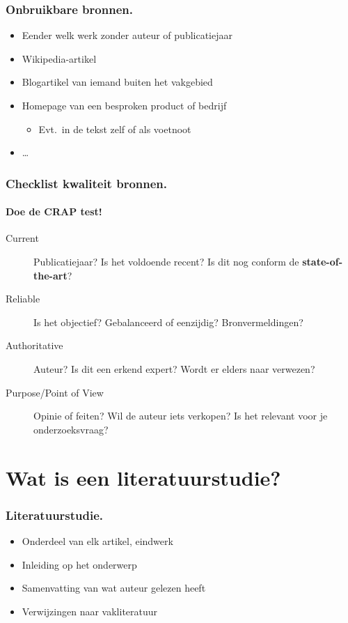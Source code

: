 \documentclass[aspectratio=169]{beamer}
\begin{document}
\begin{frame}
  \frametitle{Onbruikbare bronnen.}

  \begin{itemize}
    \item Eender welk werk zonder auteur of publicatiejaar
    \item Wikipedia-artikel
    \item Blogartikel van iemand buiten het vakgebied
    \item Homepage van een besproken product of bedrijf
    \begin{itemize}
      \item Evt.~in de tekst zelf of als voetnoot
    \end{itemize}
    \item \dots
  \end{itemize}
\end{frame}

\begin{frame}
  \frametitle{Checklist kwaliteit bronnen.}
  \framesubtitle{Doe de CRAP test!}

  \begin{description}
    \item[Current] Publicatiejaar? Is het voldoende recent? Is dit nog conform de \textbf{state-of-the-art}?
    \item[Reliable] Is het objectief? Gebalanceerd of eenzijdig?
    Bronvermeldingen?
    \item[Authoritative] Auteur? Is dit een erkend expert? Wordt er elders naar verwezen?
    \item[Purpose/Point of View] Opinie of feiten? Wil de auteur iets verkopen? Is het relevant voor je onderzoeksvraag?
  \end{description}

\end{frame}



\section{Wat is een literatuurstudie?}

\begin{frame}
  \frametitle{Literatuurstudie.}

  \begin{itemize}
    \item Onderdeel van elk artikel, eindwerk
    \item Inleiding op het onderwerp
    \item Samenvatting van wat auteur gelezen heeft
    \item Verwijzingen naar vakliteratuur
  \end{itemize}

\end{frame}
\end{document}
